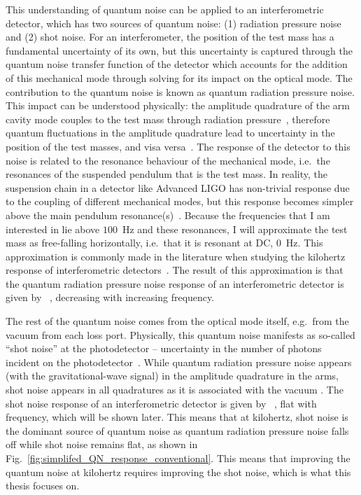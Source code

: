 This understanding of quantum noise can be applied to an interferometric detector, which has two sources of quantum noise: (1) radiation pressure noise and (2) shot noise. 
For an interferometer, the position of the test mass has a fundamental uncertainty of its own, but this uncertainty is captured through the quantum noise transfer function of the detector which accounts for the addition of this mechanical mode through solving for its impact on the optical mode. The contribution to the quantum noise is known as quantum radiation pressure noise. 
This impact can be understood physically: the amplitude quadrature of the arm cavity mode couples to the test mass through radiation pressure~\cite{}, therefore quantum fluctuations in the amplitude quadrature lead to uncertainty in the position of the test masses, and visa versa~\cite{Danilishin?}. The response of the detector to this noise is related to the resonance behaviour of the mechanical mode, i.e.\ the resonances of the suspended pendulum that is the test mass. In reality, the suspension chain in a detector like Advanced LIGO has non-trivial response due to the coupling of different mechanical modes, but this response becomes simpler above the main pendulum resonance(s)~\cite{}. Because the frequencies that I am interested in lie above $100$~Hz and these resonances, I will approximate the test mass as free-falling horizontally, i.e.\ that it is resonant at DC, $0$~Hz. This approximation is commonly made in the literature when studying the kilohertz response of interferometric detectors~\cite{}. The result of this approximation is that the quantum radiation pressure noise response of an interferometric detector is given by ~\cite{}, decreasing with increasing frequency.

The rest of the quantum noise comes from the optical mode itself, e.g.\ from the vacuum from each loss port. Physically, this quantum noise manifests as so-called ``shot noise'' at the photodetector -- uncertainty in the number of photons incident on the photodetector~\cite{}. While quantum radiation pressure noise appears (with the gravitational-wave signal) in the amplitude quadrature in the arms, shot noise appears in all quadratures as it is associated with the vacuum . The shot noise response of an interferometric detector is given by ~\cite{}, flat with frequency, which will be shown later. This means that at kilohertz, shot noise is the dominant source of quantum noise as quantum radiation pressure noise falls off while shot noise remains flat, as shown in Fig.~\ref{fig:simplifed_QN_response_conventional}. This means that improving the quantum noise at kilohertz requires improving the shot noise, which is what this thesis focuses on. 

